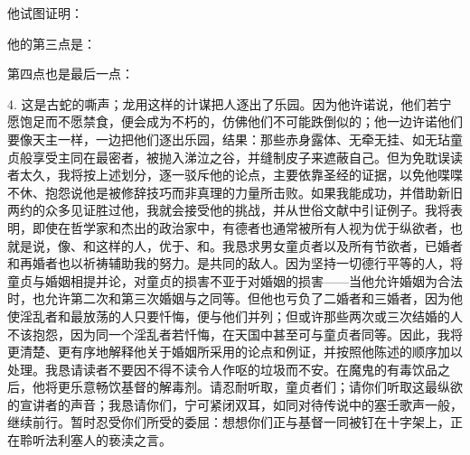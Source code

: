 他试图证明：\par

他的第三点是：\par

第四点也是最后一点：\par

4. 这是古蛇的嘶声；龙用这样的计谋把人逐出了乐园。因为他许诺说，他们若宁愿饱足而不愿禁食，便会成为不朽的，仿佛他们不可能跌倒似的；他一边许诺他们要像天主一样，一边把他们逐出乐园，结果：那些赤身露体、无牵无挂、如无玷童贞般享受主同在最密者，被抛入涕泣之谷，并缝制皮子来遮蔽自己。但为免耽误读者太久，我将按上述划分，逐一驳斥他的论点，主要依靠圣经的证据，以免他喋喋不休、抱怨说他是被修辞技巧而非真理的力量所击败。如果我能成功，并借助新旧两约的众多见证胜过他，我就会接受他的挑战，并从世俗文献中引证例子。我将表明，即使在哲学家和杰出的政治家中，有德者也通常被所有人视为优于纵欲者，也就是说，像、和这样的人，优于、和。我恳求男女童贞者以及所有节欲者，已婚者和再婚者也以祈祷辅助我的努力。是共同的敌人。因为坚持一切德行平等的人，将童贞与婚姻相提并论，对童贞的损害不亚于对婚姻的损害——当他允许婚姻为合法时，也允许第二次和第三次婚姻与之同等。但他也亏负了二婚者和三婚者，因为他使淫乱者和最放荡的人只要忏悔，便与他们并列；但或许那些两次或三次结婚的人不该抱怨，因为同一个淫乱者若忏悔，在天国中甚至可与童贞者同等。因此，我将更清楚、更有序地解释他关于婚姻所采用的论点和例证，并按照他陈述的顺序加以处理。我恳请读者不要因不得不读令人作呕的垃圾而不安。在魔鬼的有毒饮品之后，他将更乐意畅饮基督的解毒剂。请忍耐听取，童贞者们；请你们听取这最纵欲的宣讲者的声音；我恳请你们，宁可紧闭双耳，如同对待传说中的塞壬歌声一般，继续前行。暂时忍受你们所受的委屈：想想你们正与基督一同被钉在十字架上，正在聆听法利塞人的亵渎之言。\par

